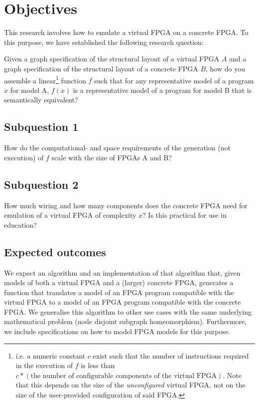 \chapter{Objectives}
\label{sec:Objectives}
This research involves how to emulate a virtual FPGA on a concrete FPGA. To this purpose, we have established the following research question:

Given a graph specification of the structural layout of a virtual FPGA $A$ and a graph specification of the structural layout of a concrete FPGA $B$, how do you assemble a linear\footnote{i.e. a numeric constant $c$ exist such that the number of instructions required in the execution of $f$ is less than $c * (\text{the number of configurable components of the virtual FPGA})$. Note that this depends on the size of the \textit{unconfigured} virtual FPGA, not on the size of the user-provided configuration of said FPGA.} function $f$ such that for any representative model of a program $x$ for model A, $f(x)$ is a representative model of a program for model B that is semantically equivalent?
\section*{Subquestion 1}
How do the computational- and space requirements of the generation (not execution) of $f$ scale with the size of FPGAs A and B?
\section*{Subquestion 2}
How much wiring and how many components does the concrete FPGA need for emulation of a virtual FPGA of complexity $x$? Is this practical for use in education?
\section*{Expected outcomes}
We expect an algorithm and an implementation of that algorithm that, given models of both a virtual FPGA and a (larger) concrete FPGA, generates a function that translates a model of an FPGA program compatible with the virtual FPGA to a model of an FPGA program compatible with the concrete FPGA. We generalise this algorithm to other use cases with the same underlying mathematical problem (node disjoint subgraph homeomorphism). Furthermore, we include specifications on how to model FPGA models for this purpose. 